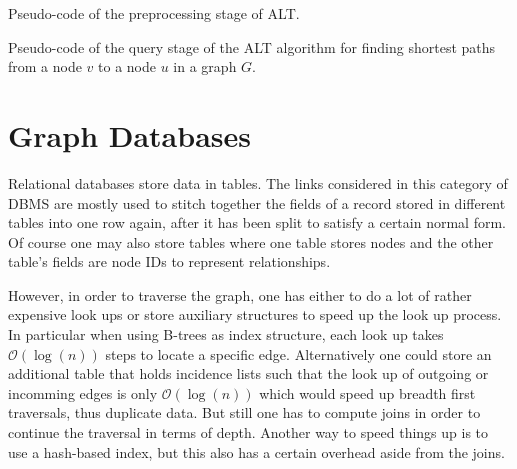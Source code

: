             
            \begin{algorithm}[htp]
                \hrulealg
            \caption{Pseudo-code of the preprocessing stage of ALT.}\label{alt-pre}
            \end{algorithm}
            \begin{algorithm}[htp]
                \hrulealg
            \caption{Pseudo-code of the query stage of the ALT algorithm for finding shortest paths from a node $v$ to a node $u$ in a graph $G$.}\label{alt-query}
            \end{algorithm}

\section{Graph Databases}
    Relational databases store data in tables.
    The links considered in this category of DBMS are mostly used to stitch together the fields of a record stored in different tables into one row again, after it has been split to satisfy a certain normal form.
    Of course one may also store tables where one table stores nodes and the other table's fields are node IDs to represent relationships.

    However, in order to traverse the graph, one has either to do a lot of rather expensive look ups or store auxiliary structures to speed up the look up process.
    In particular when using B-trees as index structure, each look up takes $\mathcal{O}(\log(n))$ steps to locate a specific edge.
    Alternatively one could store an additional table that holds incidence lists such that the look up of outgoing or incomming edges is only $\mathcal{O}(\log(n))$ which would speed up breadth first traversals, thus duplicate data.
    But still one has to compute joins in order to continue the traversal in terms of depth.
    Another way to speed things up is to use a hash-based index, but this also has a certain overhead aside from the joins.
    
